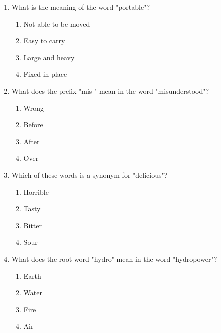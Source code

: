 \documentclass[12pt]{article}
\begin{document}
\begin{enumerate}
    \vspace{0.5cm}

    \item What is the meaning of the word "portable"?

    \begin{enumerate}[label=\Alph*.]
        \item Not able to be moved
        \item Easy to carry
        \item Large and heavy
        \item Fixed in place
    \end{enumerate}
    
    \vspace{0.5cm}

    \item What does the prefix "mis-" mean in the word "misunderstood"?

    \begin{enumerate}[label=\Alph*.]
        \item Wrong
        \item Before
        \item After
        \item Over
    \end{enumerate}
    
    \vspace{0.5cm}

    \item Which of these words is a synonym for "delicious"?

    \begin{enumerate}[label=\Alph*.]
        \item Horrible
        \item Tasty
        \item Bitter
        \item Sour
    \end{enumerate}
    
    \vspace{0.5cm}

    \item What does the root word "hydro" mean in the word "hydropower"?

    \begin{enumerate}[label=\Alph*.]
        \item Earth
        \item Water
        \item Fire
        \item Air
    \end{enumerate}
    

\end{enumerate}
\end{document}

